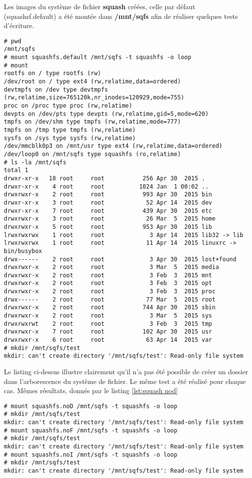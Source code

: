 Les images du système de fichier \textbf{squash} créées, celle par défaut (squashsf.default) a été montée dans \textbf{/mnt/sqfs} afin de réaliser quelques tests d'écriture.
\begin{lstlisting}[style=Bash]
# pwd
/mnt/sqfs
# mount squashfs.default /mnt/sqfs -t squashfs -o loop
# mount
rootfs on / type rootfs (rw)
/dev/root on / type ext4 (rw,relatime,data=ordered)
devtmpfs on /dev type devtmpfs (rw,relatime,size=765120k,nr_inodes=120929,mode=755)
proc on /proc type proc (rw,relatime)
devpts on /dev/pts type devpts (rw,relatime,gid=5,mode=620)
tmpfs on /dev/shm type tmpfs (rw,relatime,mode=777)
tmpfs on /tmp type tmpfs (rw,relatime)
sysfs on /sys type sysfs (rw,relatime)
/dev/mmcblk0p3 on /mnt/usr type ext4 (rw,relatime,data=ordered)
/dev/loop0 on /mnt/sqfs type squashfs (ro,relatime)
# ls -la /mnt/sqfs
total 1
drwxr-xr-x   18 root     root           256 Apr 30  2015 .
drwxr-xr-x    4 root     root          1024 Jan  1 00:02 ..
drwxrwxr-x    2 root     root           993 Apr 30  2015 bin
drwxr-xr-x    3 root     root            52 Apr 14  2015 dev
drwxr-xr-x    7 root     root           439 Apr 30  2015 etc
drwxrwxr-x    3 root     root            26 Mar  5  2015 home
drwxrwxr-x    5 root     root           953 Apr 30  2015 lib
lrwxrwxrwx    1 root     root             3 Apr 14  2015 lib32 -> lib
lrwxrwxrwx    1 root     root            11 Apr 14  2015 linuxrc -> bin/busybox
drwx------    2 root     root             3 Apr 30  2015 lost+found
drwxrwxr-x    2 root     root             3 Mar  5  2015 media
drwxrwxr-x    2 root     root             3 Feb  3  2015 mnt
drwxrwxr-x    2 root     root             3 Feb  3  2015 opt
drwxrwxr-x    2 root     root             3 Feb  3  2015 proc
drwx------    2 root     root            77 Mar  5  2015 root
drwxrwxr-x    2 root     root           744 Apr 30  2015 sbin
drwxrwxr-x    2 root     root             3 Mar  5  2015 sys
drwxrwxrwt    2 root     root             3 Feb  3  2015 tmp
drwxrwxr-x    7 root     root           102 Apr 30  2015 usr
drwxrwxr-x    6 root     root            63 Apr 14  2015 var
# mkdir /mnt/sqfs/test
mkdir: can't create directory '/mnt/sqfs/test': Read-only file system
\end{lstlisting}

Le listing ci-dessus illustre clairement qu'il n'a pas été possible de créer un dossier dans l'arborescence du système de fichier. Le même test a été réalisé pour chaque cas. Mêmes résultats, donnés par le listing \ref{lst:squash nod}

\begin{lstlisting}[style=Bash,caption=squashfs.noD,label=squash nod]
# mount squashfs.noD /mnt/sqfs -t squashfs -o loop
# mkdir /mnt/sqfs/test
mkdir: can't create directory '/mnt/sqfs/test': Read-only file system
# mount squashfs.noF /mnt/sqfs -t squashfs -o loop
# mkdir /mnt/sqfs/test
mkdir: can't create directory '/mnt/sqfs/test': Read-only file system
# mount squashfs.noI /mnt/sqfs -t squashfs -o loop
# mkdir /mnt/sqfs/test
mkdir: can't create directory '/mnt/sqfs/test': Read-only file system
\end{lstlisting}

